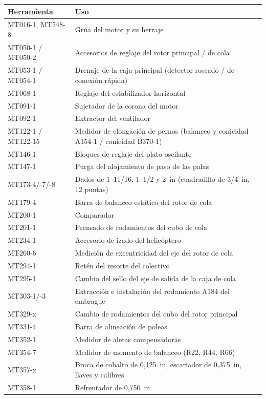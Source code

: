 \begin{center}
\small
\begin{tabularx}{\linewidth}{@{}l>{\raggedright\arraybackslash}X@{}}
\toprule
Herramienta & Uso \\
\midrule
MT016-1, MT548-8 & Grúa del motor y su herraje \\
MT050-1 / MT050-2 & Accesorios de reglaje del rotor principal / de cola \\
MT053-1 / MT054-1 & Drenaje de la caja principal (detector roscado / de conexión rápida) \\
MT068-1 & Reglaje del estabilizador horizontal \\
MT091-1 & Sujetador de la corona del motor \\
MT092-1 & Extractor del ventilador \\
MT122-1 / MT122-15 & Medidor de elongación de pernos (balanceo y conicidad A154-1 / conicidad B370-1) \\
MT146-1 & Bloques de reglaje del plato oscilante \\
MT147-1 & Purga del alojamiento de paso de las palas \\
MT173-4/-7/-8 & Dados de 1~11/16, 1~1/2 y 2~in (cuadradillo de 3/4~in, 12 puntas) \\
MT179-4 & Barra de balanceo estático del rotor de cola \\
MT200-1 & Comparador \\
MT201-1 & Prensado de rodamientos del cubo de cola \\
MT234-1 & Accesorio de izado del helicóptero \\
MT260-6 & Medición de excentricidad del eje del rotor de cola \\
MT294-1 & Retén del resorte del colectivo \\
MT295-1 & Cambio del sello del eje de salida de la caja de cola \\
MT303-1/-3 & Extracción e instalación del rodamiento A184 del embrague \\
MT329-x & Cambio de rodamientos del cubo del rotor principal \\
MT331-4 & Barra de alineación de poleas \\
MT352-1 & Medidor de aletas compensadoras \\
MT354-7 & Medidor de momento de balanceo (R22, R44, R66) \\
MT357-x & Broca de cobalto de 0,125~in, escariador de 0,375~in, llaves y calibres \\
MT358-1 & Refrentador de 0,750~in \\

\end{tabularx}
\end{center}
